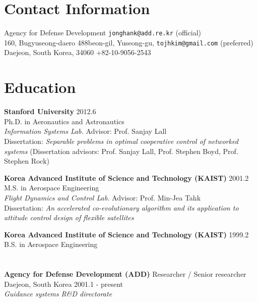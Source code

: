 \documentclass[margin,line]{res}
\begin{document}

\begin{resume}

\section{\sc Contact Information}
Agency for Defense Development \hfill
{\texttt{jonghank@add.re.kr}} \hspace{0.9mm} (official)\\
160, Bugyuseong-daero 488beon-gil, Yuseong-gu, 	\hfill {\texttt{tojhkim@gmail.com}} (preferred)\\
Daejeon, South Korea, 34060 \hfill +82-10-9056-2543

\section{\sc Education}
\textbf{Stanford University} \hfill 2012.6 \\
Ph.D. in Aeronautics and Astronautics \\
\emph{Information Systems Lab.} \hfill Advisor: Prof. Sanjay Lall \\
Dissertation: \emph{Separable problems in optimal cooperative control of networked systems }
(Dissertation advisors: Prof. Sanjay Lall, Prof. Stephen Boyd, Prof. Stephen Rock)

\textbf{Korea Advanced Institute of Science and Technology (KAIST)} \hfill
2001.2 \\ 
M.S. in Aerospace Engineering\\ 
\emph{Flight Dynamics and Control Lab.} \hfill Advisor: Prof. Min-Jea Tahk \\
Dissertation: \emph{An accelerated co-evolutionary algorithm and its application to attitude control design of flexible satellites}

\textbf{Korea Advanced Institute of Science and Technology (KAIST)} \hfill
1999.2 \\ 
B.S. in Aerospace Engineering 

\section{}

\textbf{Agency for Defense Development (ADD)} \hfill {Researcher / Senior researcher} \\
Daejeon, South Korea \hfill {2001.1 - present} \\
\emph{Guidance systems R\&D directorate}


\end{resume}
\end{document}
